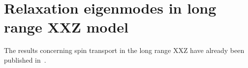 \chapter{Relaxation eigenmodes in long range XXZ model}
\thispagestyle{chapterBeginStyle}

The results concerning spin transport in the long range XXZ have already been published in~\textcite{Mierzejewski2023}.